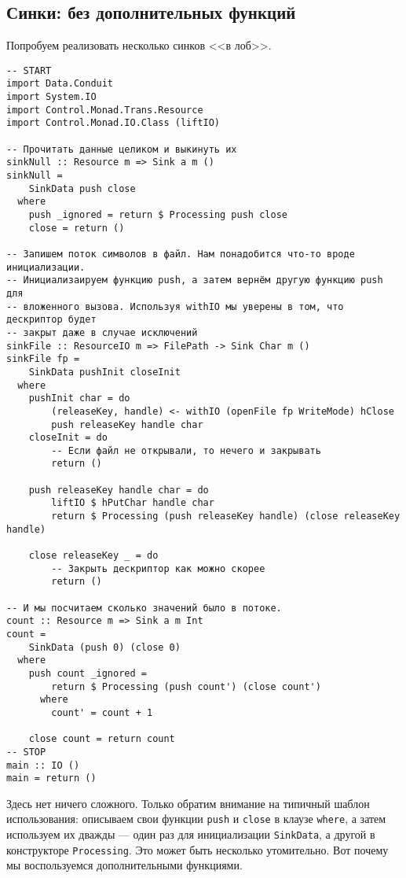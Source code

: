 \subsection{Синки: без дополнительных функций}
Попробуем реализовать несколько синков <<в лоб>>.
\begin{lstlisting}
-- START
import Data.Conduit
import System.IO
import Control.Monad.Trans.Resource
import Control.Monad.IO.Class (liftIO)

-- Прочитать данные целиком и выкинуть их
sinkNull :: Resource m => Sink a m ()
sinkNull =
    SinkData push close
  where
    push _ignored = return $ Processing push close
    close = return ()

-- Запишем поток символов в файл. Нам понадобится что-то вроде инициализации.
-- Инициализаируем функцию push, а затем вернём другую функцию push для 
-- вложенного вызова. Используя withIO мы уверены в том, что дескриптор будет 
-- закрыт даже в случае исключений
sinkFile :: ResourceIO m => FilePath -> Sink Char m ()
sinkFile fp =
    SinkData pushInit closeInit
  where
    pushInit char = do
        (releaseKey, handle) <- withIO (openFile fp WriteMode) hClose
        push releaseKey handle char
    closeInit = do
        -- Если файл не открывали, то нечего и закрывать
        return ()

    push releaseKey handle char = do
        liftIO $ hPutChar handle char
        return $ Processing (push releaseKey handle) (close releaseKey handle)

    close releaseKey _ = do
        -- Закрыть дескриптор как можно скорее
        return ()

-- И мы посчитаем сколько значений было в потоке.
count :: Resource m => Sink a m Int
count =
    SinkData (push 0) (close 0)
  where
    push count _ignored =
        return $ Processing (push count') (close count')
      where
        count' = count + 1

    close count = return count
-- STOP
main :: IO ()
main = return ()
\end{lstlisting}
Здесь нет ничего сложного. Только обратим внимание на типичный шаблон использования:
описываем свои функции \lstinline'push' и \lstinline'close' в клаузе \lstinline'where', а
затем используем их дважды --- 
один раз для инициализации \lstinline'SinkData', а другой в конструкторе
\lstinline'Processing'. 
Это может быть несколько утомительно. Вот почему мы воспользуемся дополнительными функциями.

